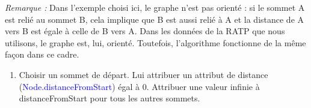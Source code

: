 \documentclass[,french]{article}
\providecommand{\tightlist}{%
  \setlength{\itemsep}{0pt}\setlength{\parskip}{0pt}}
\begin{document}
\begin{center}
\end{center}

\emph{Remarque :} Dans l'exemple choisi ici, le graphe n'est pas orienté
: si le sommet A est relié au sommet B, cela implique que B est aussi
relié à A et la distance de A vers B est égale à celle de B vers A. Dans
les données de la RATP que nous utilisons, le graphe est, lui, orienté.
Toutefois, l'algorithme fonctionne de la même façon dans ce cadre.

\begin{enumerate}
\def\labelenumi{\arabic{enumi}.}
\setcounter{enumi}{1}
\tightlist
\item
  Choisir un sommet de départ. Lui attribuer un attribut de distance
  (\textcolor{blue}{Node.distanceFromStart}) égal à 0. Attribuer une
  valeur infinie à distanceFromStart pour tous les autres sommets.
\end{enumerate}
\end{document}
